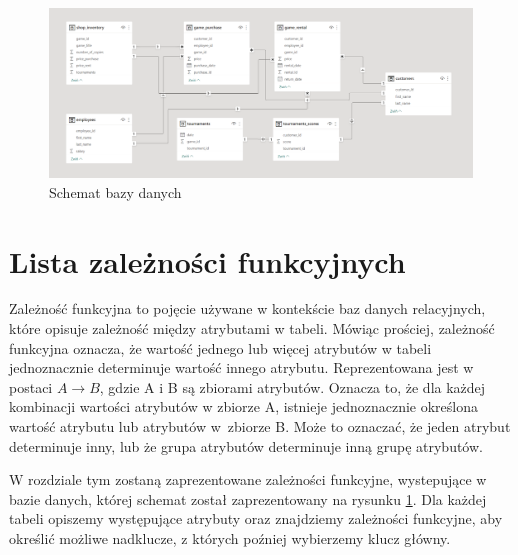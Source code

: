 \documentclass{article}
\theoremstyle{break}
\begin{document}
	\begin{figure}[H]
		\begin{center}
			\includegraphics[scale=0.22]{schemat.png}
			\caption{Schemat bazy danych}
			\label{fig:schemat}
		\end{center}
	\end{figure}
	
	\section{Lista zależności funkcyjnych}

	\hspace{0.5cm}Zależność funkcyjna to pojęcie używane w kontekście baz danych relacyjnych, które opisuje zależność między atrybutami w tabeli. Mówiąc prościej, zależność funkcyjna oznacza, że wartość jednego lub więcej atrybutów w tabeli jednoznacznie determinuje wartość innego atrybutu. Reprezentowana jest w postaci $A \rightarrow B$, gdzie A i B są zbiorami atrybutów. Oznacza to, że dla każdej kombinacji wartości atrybutów w zbiorze A, istnieje jednoznacznie określona wartość atrybutu lub atrybutów w~zbiorze B. Może to oznaczać, że jeden atrybut determinuje inny, lub że grupa atrybutów determinuje inną grupę atrybutów.
	
	W rozdziale tym zostaną zaprezentowane zależności funkcyjne, wystepujące w bazie danych, której schemat został zaprezentowany na rysunku \ref{fig:schemat}. Dla każdej tabeli opiszemy występujące atrybuty oraz znajdziemy zależności funkcyjne, aby określić możliwe nadklucze, z których poźniej wybierzemy klucz główny.
	
\end{document}
